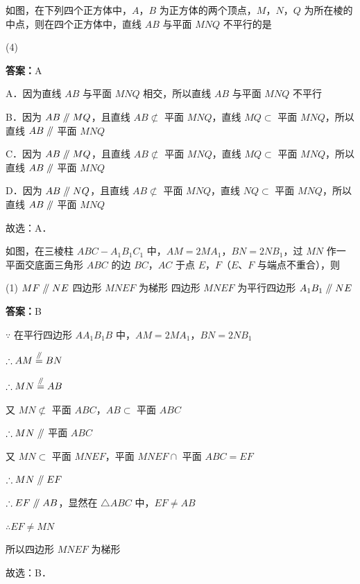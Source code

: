 \vspace{2em}

\begin{example}[\bkstar{2}{5}]
如图，在下列四个正方体中，$A$，$B$ 为正方体的两个顶点，$M$，$N$，$Q$ 为所在棱的中点，则在四个正方体中，直线 $AB$ 与平面 $MNQ$ 不平行的是
\begin{tasks}(4)
    \task \raisebox{-.5\height}{\resizebox{0.13\textwidth}{!}{}}
    \task \raisebox{-.5\height}{\resizebox{0.13\textwidth}{!}{}}
    \task \raisebox{-.5\height}{\resizebox{0.13\textwidth}{!}{}}
    \task \raisebox{-.5\height}{\resizebox{0.13\textwidth}{!}{}}
\end{tasks}
\end{example}
\begin{solution}
\textbf{答案：}A

A．因为直线 $AB$ 与平面 $MNQ$ 相交，所以直线 $AB$ 与平面 $MNQ$ 不平行

B．因为 $AB\mathrel{/\mkern-5mu/} MQ$，且直线 $AB\not\subset$ 平面 $MNQ$，直线 $MQ\subset$ 平面 $MNQ$，所以直线 $AB\mathrel{/\mkern-5mu/}$ 平面 $MNQ$

C．因为 $AB\mathrel{/\mkern-5mu/} MQ$，且直线 $AB\not\subset$ 平面 $MNQ$，直线 $MQ\subset$ 平面 $MNQ$，所以直线 $AB\mathrel{/\mkern-5mu/}$ 平面 $MNQ$

D．因为 $AB\mathrel{/\mkern-5mu/} NQ$，且直线 $AB\not\subset$ 平面 $MNQ$，直线 $NQ\subset$ 平面 $MNQ$，所以直线 $AB\mathrel{/\mkern-5mu/}$ 平面 $MNQ$

故选：A．
\end{solution}

\vspace{2em}

\begin{example}[\bkstar{3}{5}]
如图，在三棱柱 $ABC-A_1B_1C_1$ 中，$AM=2MA_1$，$BN=2NB_1$，过 $MN$ 作一平面交底面三角形 $ABC$ 的边 $BC$，$AC$ 于点 $E$，$F$（$E$、$F$ 与端点不重合），则
\begin{tasks}(1)
    \task $MF\mathrel{/\mkern-5mu/} NE$
    \task 四边形 $MNEF$ 为梯形
    \task 四边形 $MNEF$ 为平行四边形
    \task $A_1B_1\mathrel{/\mkern-5mu/} NE$
\end{tasks}
\end{example}
\begin{solution}
\textbf{答案：}B

$\because$ 在平行四边形 $AA_1B_1B$ 中，$AM=2MA_1$，$BN=2NB_1$

$\therefore AM\overset{\mathrel{/\mkern-5mu/}}{=}BN$

$\therefore MN\overset{\mathrel{/\mkern-5mu/}}{=}AB$

又 $MN\not\subset$ 平面 $ABC$，$AB\subset$ 平面 $ABC$

$\therefore MN\mathrel{/\mkern-5mu/}$ 平面 $ABC$

又 $MN\subset$ 平面 $MNEF$，平面 $MNEF\cap$ 平面 $ABC=EF$

$\therefore MN\mathrel{/\mkern-5mu/} EF$

$\therefore EF\mathrel{/\mkern-5mu/} AB$，显然在 $\triangle ABC$ 中，$EF\neq AB$

$\therefore EF\neq MN$

所以四边形 $MNEF$ 为梯形

故选：B．
\end{solution}

